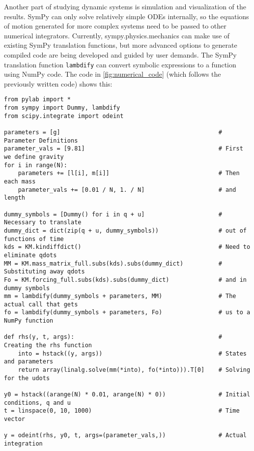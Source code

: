 \documentclass[twocolumn,10pt]{asme2e}
\begin{document}
Another part of studying dynamic systems is simulation and visualization of the
results.  SymPy can only solve relatively simple ODEs internally, so the
equations of motion generated for more complex systems need to be passed to
other numerical integrators.  Currently, sympy.physics.mechanics can make use
of existing SymPy translation functions, but more advanced options to generate
compiled code are being developed and guided by user demands.  The SymPy
translation function \verb|lambdify| can convert symbolic expressions to a
function using NumPy code.  The code in \ref{fig:numerical_code} (which follows
the previously written code) shows this:

\begin{figure*}
\begin{Verbatim}[frame=single]
from pylab import *
from sympy import Dummy, lambdify
from scipy.integrate import odeint

parameters = [g]                                             # Parameter Definitions
parameter_vals = [9.81]                                      # First we define gravity
for i in range(N):
    parameters += [l[i], m[i]]                               # Then each mass
    parameter_vals += [0.01 / N, 1. / N]                     # and length

dummy_symbols = [Dummy() for i in q + u]                     # Necessary to translate
dummy_dict = dict(zip(q + u, dummy_symbols))                 # out of functions of time
kds = KM.kindiffdict()                                       # Need to eliminate qdots
MM = KM.mass_matrix_full.subs(kds).subs(dummy_dict)          # Substituting away qdots
Fo = KM.forcing_full.subs(kds).subs(dummy_dict)              # and in dummy symbols
mm = lambdify(dummy_symbols + parameters, MM)                # The actual call that gets
fo = lambdify(dummy_symbols + parameters, Fo)                # us to a NumPy function

def rhs(y, t, args):                                         # Creating the rhs function
    into = hstack((y, args))                                 # States and parameters
    return array(linalg.solve(mm(*into), fo(*into))).T[0]    # Solving for the udots

y0 = hstack((arange(N) * 0.01, arange(N) * 0))               # Initial conditions, q and u
t = linspace(0, 10, 1000)                                    # Time vector

y = odeint(rhs, y0, t, args=(parameter_vals,))               # Actual integration

\end{Verbatim}
\label{ref:numerical_code}
\end{figure*}
\end{document}
